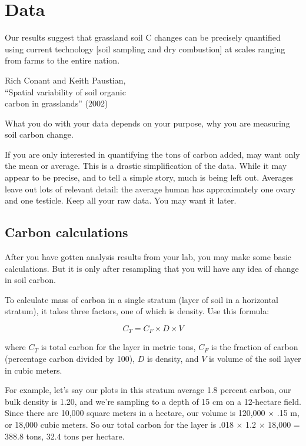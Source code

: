 \documentclass[11pt,letterpaper,oneside,onecolumn]{memoir}
\begin{document}
\chapter{Data}

\epigraph{Our results suggest that grassland soil C changes can be precisely quantified using current technology [soil sampling and dry combustion] at scales ranging from farms to the entire nation.}{Rich Conant and Keith Paustian,\\``Spatial variability of soil organic \\carbon in grasslands'' (2002)}

\noindent What you do with your data depends on your purpose, why you are measuring soil carbon change.

If you are only interested in quantifying the tons of carbon added, may want only the mean or average. This is a drastic simplification of the data. While it may appear to be precise, and to tell a simple story, much is being left out. Averages leave out lots of relevant detail: the average human has approximately one ovary and one testicle. Keep all your raw data. You may want it later.

\section{Carbon calculations}

After you have gotten analysis results from your lab, you may make some basic calculations. But it is only after resampling that you will have any idea of change in soil carbon.

To calculate mass of carbon in a single stratum (layer of soil in a horizontal stratum), it takes three factors, one of which is density. Use this formula:

\begin{equation}C_{T}=C_{F} \times D \times V\end{equation}

\noindent where $C_{T}$ is total carbon for the layer in metric tons, $C_{F}$ is the fraction of carbon (percentage carbon divided by 100), $D$ is density, and $V$ is volume of the soil layer in cubic meters.

For example, let's say our plots in this stratum average 1.8 percent carbon, our bulk density is 1.20, and we're sampling to a depth of 15 cm on a 12-hectare field. Since there are 10,000 square meters in a hectare, our volume is 120,000 $\times$ .15 m, or 18,000 cubic meters. So our total carbon for the layer is .018 $\times$ 1.2 $\times$ 18,000 = 388.8 tons, 32.4 tons per hectare.
\end{document}
